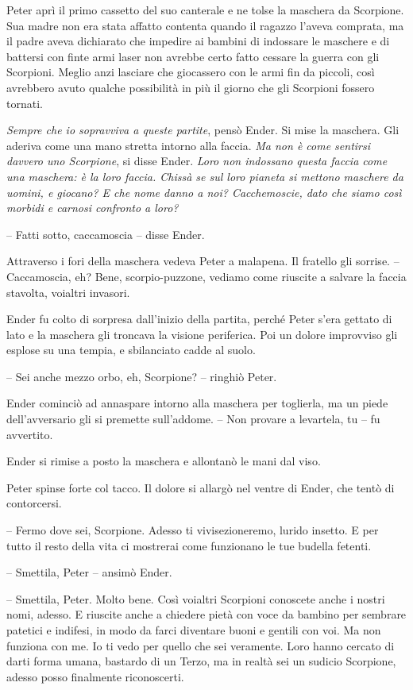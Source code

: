 {Peter aprì il primo cassetto del suo canterale e ne tolse la maschera
	da Scorpione. Sua madre non era stata affatto contenta quando il ragazzo
	l'aveva comprata, ma il padre aveva dichiarato che impedire ai bambini
	di indossare le maschere e di battersi con finte armi laser non avrebbe
	certo fatto cessare la guerra con gli Scorpioni. Meglio anzi lasciare
	che giocassero con le armi fin da piccoli, così avrebbero avuto qualche
	possibilità in più il giorno che gli Scorpioni fossero tornati.}

\emph{{Sempre che io sopravviva a queste partite}}{, \emph{} pensò
	Ender. Si mise la maschera. Gli aderiva come una mano stretta intorno
	alla faccia. \emph{Ma non è come sentirsi davvero uno Scorpione},
	\emph{} si disse Ender. \emph{Loro non indossano questa faccia come una
		maschera: è la loro faccia. Chissà se sul loro pianeta si mettono
		maschere da uomini, e giocano? E che nome danno a noi? Cacchemoscie,
		dato che siamo così morbidi e carnosi confronto a loro?}}

{-- Fatti sotto, caccamoscia -- disse Ender.}

{Attraverso i fori della maschera vedeva Peter a malapena. Il fratello
	gli sorrise. -- Caccamoscia, eh? Bene, scorpio-puzzone, vediamo come
	riuscite a salvare la faccia stavolta, voialtri invasori.}

{Ender fu colto di sorpresa dall'inizio della partita, perché Peter
	s'era gettato di lato e la maschera gli troncava la visione periferica.
	Poi un dolore improvviso gli esplose su una tempia, e sbilanciato cadde
	al suolo.}

{-- Sei anche mezzo orbo, eh, Scorpione? -- ringhiò Peter.}

{Ender cominciò ad annaspare intorno alla maschera per toglierla, ma un
	piede dell'avversario gli si premette sull'addome. -- Non provare a
	levartela, tu -- fu avvertito.}

{Ender si rimise a posto la maschera e allontanò le mani dal viso.}

{Peter spinse forte col tacco. Il dolore si allargò nel ventre di Ender,
	che tentò di contorcersi.}

{-- Fermo dove sei, Scorpione. Adesso ti vivisezioneremo, lurido
	insetto. E per tutto il resto della vita ci mostrerai come funzionano le
	tue budella fetenti.}

{-- Smettila, Peter -- ansimò Ender.}

{-- Smettila, Peter. Molto bene. Così voialtri Scorpioni conoscete anche
	i nostri nomi, adesso. E riuscite anche a chiedere pietà con voce da
	bambino per sembrare patetici e indifesi, in modo da farci diventare
	buoni e gentili con voi. Ma non funziona con me. Io ti vedo per quello
	che sei veramente. Loro hanno cercato di darti forma umana, bastardo di
	un Terzo, ma in realtà sei un sudicio Scorpione, adesso posso finalmente
	riconoscerti.}

